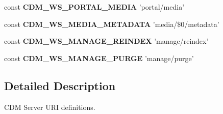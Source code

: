 \begin{DoxyCompactItemize}
\item 
\hypertarget{webservice__uris_8php_a49281344c86ab869f6002cdbef6dbc3e}{const {\bfseries C\-D\-M\-\_\-\-W\-S\-\_\-\-P\-O\-R\-T\-A\-L\-\_\-\-M\-E\-D\-I\-A} 'portal/media'}\label{webservice__uris_8php_a49281344c86ab869f6002cdbef6dbc3e}

\item 
\hypertarget{webservice__uris_8php_a749bec336aa49f1e015bbc9a4f7d40ac}{const {\bfseries C\-D\-M\-\_\-\-W\-S\-\_\-\-M\-E\-D\-I\-A\-\_\-\-M\-E\-T\-A\-D\-A\-T\-A} 'media/\$0/metadata'}\label{webservice__uris_8php_a749bec336aa49f1e015bbc9a4f7d40ac}

\item 
\hypertarget{webservice__uris_8php_a83f078397b1a9a30443802024885b3fe}{const {\bfseries C\-D\-M\-\_\-\-W\-S\-\_\-\-M\-A\-N\-A\-G\-E\-\_\-\-R\-E\-I\-N\-D\-E\-X} 'manage/reindex'}\label{webservice__uris_8php_a83f078397b1a9a30443802024885b3fe}

\item 
\hypertarget{webservice__uris_8php_a4f5643dacb07681d4c4a39ba1052ef30}{const {\bfseries C\-D\-M\-\_\-\-W\-S\-\_\-\-M\-A\-N\-A\-G\-E\-\_\-\-P\-U\-R\-G\-E} 'manage/purge'}\label{webservice__uris_8php_a4f5643dacb07681d4c4a39ba1052ef30}

\end{DoxyCompactItemize}


\subsection{Detailed Description}
C\-D\-M Server U\-R\-I definitions. 

